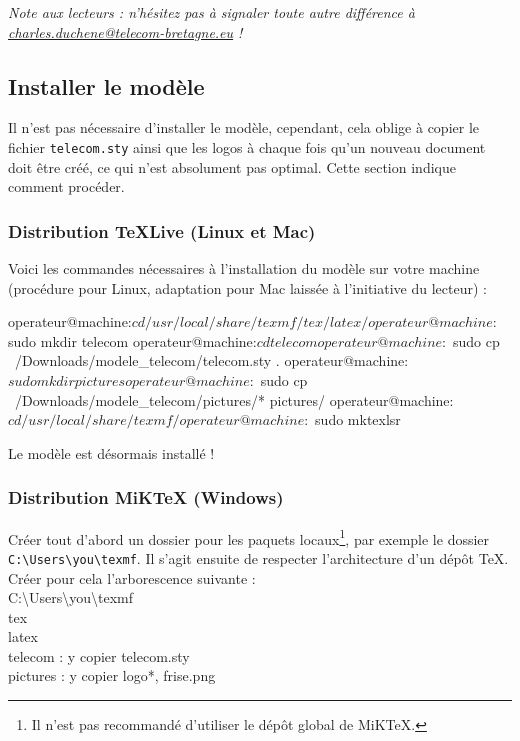 \emph{Note aux lecteurs : n'hésitez pas à signaler toute autre différence à \url{charles.duchene@telecom-bretagne.eu} !}

\subsection{Installer le modèle}

Il n'est pas nécessaire d'installer le modèle, cependant, cela oblige à copier le fichier \texttt{telecom.sty} ainsi que les logos à chaque fois qu'un nouveau document doit être créé, ce qui n'est absolument pas optimal. Cette section indique comment procéder.

\subsubsection{Distribution \TeX Live (Linux et Mac)}

Voici les commandes nécessaires à l'installation du modèle sur votre machine (procédure pour Linux, adaptation pour Mac laissée à l'initiative du lecteur) : 

\begin{bash}
operateur@machine:$ cd /usr/local/share/texmf/tex/latex/
operateur@machine:$ sudo mkdir telecom
operateur@machine:$ cd telecom
operateur@machine:$ sudo cp ~/Downloads/modele_telecom/telecom.sty . 
operateur@machine:$ sudo mkdir pictures
operateur@machine:$ sudo cp ~/Downloads/modele_telecom/pictures/* pictures/ 
operateur@machine:$ cd /usr/local/share/texmf/
operateur@machine:$ sudo mktexlsr
\end{bash}

Le modèle est désormais installé !

\subsubsection{Distribution MiK\TeX{} (Windows)}

Créer tout d'abord un dossier pour les paquets locaux\footnote{Il n'est pas recommandé d'utiliser le dépôt global de MiK\TeX.}, par exemple le dossier \texttt{C:\textbackslash Users\textbackslash you\textbackslash texmf}. Il s'agit ensuite de respecter l'architecture d'un dépôt \TeX. Créer pour cela l'arborescence suivante :\\
{\ttfamily
	C:\textbackslash Users\textbackslash you\textbackslash texmf \\
	\hspace*{0.5cm} tex \\
	\hspace*{1 cm} latex \\
	\hspace*{1.5 cm} telecom : y copier telecom.sty\\
	\hspace*{2 cm} pictures : y copier logo*, frise.png
}\\

